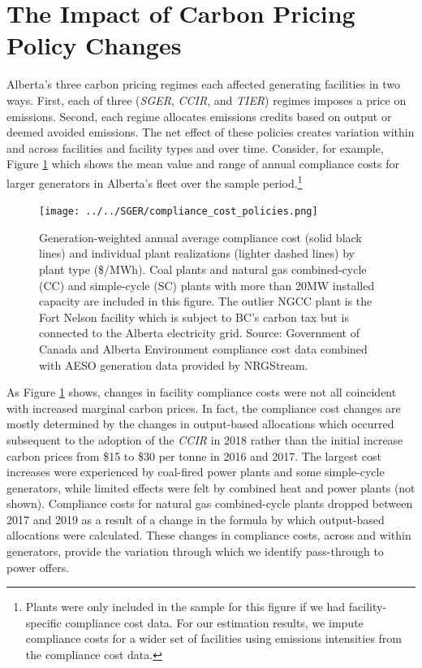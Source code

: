 \documentclass[12pt]{article}
\newcommand{\coe}{\text{CO$_2$e }}
\begin{document}
\section{The Impact of Carbon Pricing Policy Changes}

Alberta's three carbon pricing regimes each affected generating facilities in two ways. First, each of three (\emph{SGER}, \emph{CCIR}, and \emph{TIER}) regimes imposes a price on emissions. Second, each regime allocates emissions credits based on output or deemed avoided emissions. The net effect of these policies creates variation within and across facilities and facility types and over time.  Consider, for example, Figure \ref{fig:sector_compliance_cost} which shows the mean value and range of annual compliance costs for larger generators in Alberta's fleet over the sample period.\footnote{Plants were only included in the sample for this figure if we had facility-specific compliance cost data. For our estimation results, we impute compliance costs for a wider set of facilities using emissions intensities from the compliance cost data.}

\begin{figure}[t]%
	\centering \vspace{-.25cm} \texttt{[image: ../../SGER/compliance\_cost\_policies.png]}
\vspace{-0.75cm}	\caption{Generation-weighted annual average compliance cost (solid black lines) and individual plant realizations (lighter dashed lines) by plant type (\$/MWh). Coal plants and natural gas combined-cycle (CC) and simple-cycle (SC) plants with more than 20MW installed capacity are included in this figure. The outlier NGCC plant is the Fort Nelson facility which is subject to BC's carbon tax but is connected to the Alberta electricity grid. Source: Government of Canada and Alberta Environment compliance cost data combined with AESO generation data provided by NRGStream.}
\label{fig:sector_compliance_cost}
\end{figure}

As Figure \ref{fig:sector_compliance_cost} shows, changes in facility compliance costs were not all coincident with increased marginal carbon prices. In fact, the compliance cost changes are mostly determined  by the changes in output-based allocations which occurred subsequent to the adoption of the \emph{CCIR} in 2018 rather than the initial increase carbon prices from \$15 to \$30 per tonne \coe in 2016 and 2017. The largest cost increases were experienced by coal-fired power plants and some simple-cycle generators, while limited effects were felt by combined heat and power plants (not shown). Compliance costs for natural gas combined-cycle plants dropped between 2017 and 2019 as a result of a change in the formula by which output-based allocations were calculated. These changes in compliance costs, across and within generators, provide the variation through which we identify pass-through to power offers.
\end{document}
